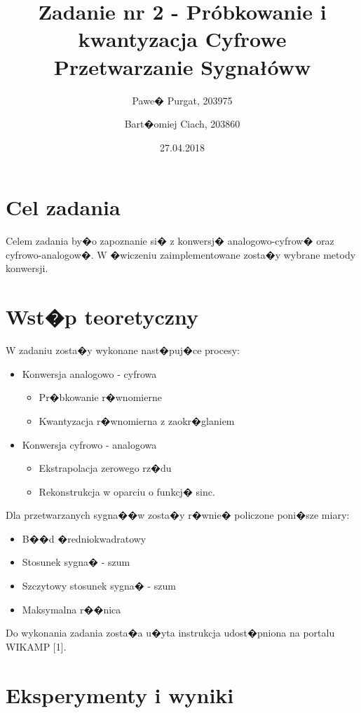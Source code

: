 \documentclass[12pt]{article}
\title{{\bf Zadanie nr 2 - Próbkowanie i kwantyzacja}\linebreak
Cyfrowe Przetwarzanie Sygnałóww}
\author{Pawe� Purgat, 203975 \and Bart�omiej Ciach, 203860}
\date{27.04.2018}
\begin{document}
\clearpage\maketitle
\thispagestyle{empty}
\newpage
\setcounter{page}{1}
\section{Cel zadania}

Celem zadania by�o zapoznanie si� z konwersj� analogowo-cyfrow� oraz cyfrowo-analogow�. W �wiczeniu zaimplementowane zosta�y wybrane metody konwersji.

\section{Wst�p teoretyczny}

W zadaniu zosta�y wykonane nast�puj�ce procesy:
\begin{itemize}
\item Konwersja analogowo - cyfrowa
\begin{itemize}
\item Pr�bkowanie r�wnomierne
\item Kwantyzacja r�wnomierna z zaokr�glaniem
\end{itemize}
\item Konwersja cyfrowo - analogowa
\begin{itemize}
\item Ekstrapolacja zerowego rz�du
\item Rekonstrukcja w oparciu o funkcj� sinc.
\end{itemize}
\end{itemize}

Dla przetwarzanych sygna��w zosta�y r�wnie� policzone poni�sze miary:
\begin{itemize}
\item B��d �redniokwadratowy
\item Stosunek sygna� - szum
\item Szczytowy stosunek sygna� - szum
\item Maksymalna r��nica
\end{itemize}

Do wykonania zadania zosta�a u�yta instrukcja udost�pniona na portalu WIKAMP [1].

\section{Eksperymenty i wyniki}
\end{document}
